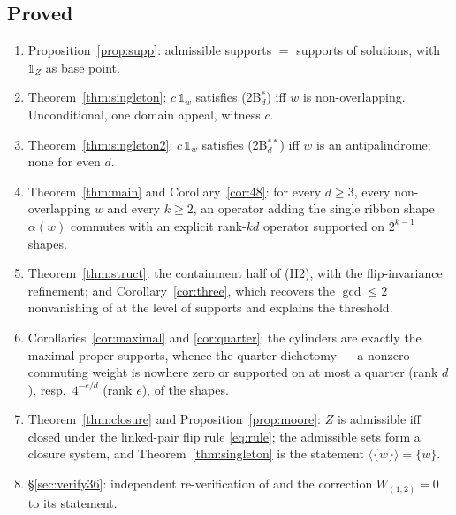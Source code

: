 \documentclass[11pt]{article}
\theoremstyle{definition}
\theoremstyle{remark}
\newcommand{\one}{\mathbb{1}}
\begin{document}
\subsection*{Proved}
\begin{enumerate}
\item Proposition~\ref{prop:supp}: admissible supports $=$ supports of solutions, with $\one_Z$
  as base point.
\item Theorem~\ref{thm:singleton}: $c\,\one_w$ satisfies (2B$^*_d$) iff $w$ is non-overlapping.
  Unconditional, one domain appeal, witness $c$.
\item Theorem~\ref{thm:singleton2}: $c\,\one_w$ satisfies (2B$^{**}_d$) iff $w$ is an
  antipalindrome; none for even $d$.
\item Theorem~\ref{thm:main} and Corollary~\ref{cor:48}: for every $d\ge3$, every
  non-overlapping $w$ and every $k\ge2$, an operator adding the single ribbon shape
  $\alpha(w)$ commutes with an explicit rank-$kd$ operator supported on $2^{k-1}$ shapes.
\item Theorem~\ref{thm:struct}: the containment half of (H2), with the flip-invariance
  refinement; and Corollary~\ref{cor:three}, which recovers the $\gcd\le2$ nonvanishing of
  \cite[Thm.~6.1]{Q150c1} at the level of supports and explains the threshold.
\item Corollaries~\ref{cor:maximal} and \ref{cor:quarter}: the cylinders are exactly the maximal
  proper supports, whence the quarter dichotomy --- a nonzero commuting weight is nowhere zero
  or supported on at most a quarter (rank $d$), resp.\ $4^{-e/d}$ (rank $e$), of the shapes.
\item Theorem~\ref{thm:closure} and Proposition~\ref{prop:moore}: $Z$ is admissible iff closed
  under the linked-pair flip rule \eqref{eq:rule}; the admissible sets form a closure system,
  and Theorem~\ref{thm:singleton} is the statement $\langle\{w\}\rangle=\{w\}$.
\item \S\ref{sec:verify36}: independent re-verification of \cite[Thm.~6.7]{Q150c1} and the
  correction $W_{(1,2)}=0$ to its statement.
\end{enumerate}
\end{document}
